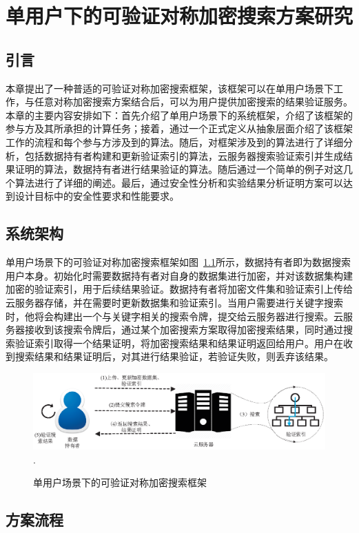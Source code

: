 \chapter{单用户下的可验证对称加密搜索方案研究}
\label{cha:single-user}
\section{引言}
本章提出了一种普适的可验证对称加密搜索框架\single，该框架可以在单用户场景下工作，与任意对称加密搜索方案结合后，可以为用户提供加密搜索的结果验证服务。本章的主要内容安排如下：首先介绍了单用户场景下的系统框架，介绍了该框架的参与方及其所承担的计算任务；接着，通过一个正式定义从抽象层面介绍了该框架工作的流程和每个参与方涉及到的算法。随后，对\single 框架涉及到的算法进行了详细分析，包括数据持有者构建和更新验证索引的算法，云服务器搜索验证索引并生成结果证明的算法，数据持有者进行结果验证的算法。随后通过一个简单的例子对这几个算法进行了详细的阐述。最后，通过安全性分析和实验结果分析证明\single 方案可以达到设计目标中的安全性要求和性能要求。

\section{系统架构}
单用户场景下的可验证对称加密搜索框架如图~\ref{fig:GS-VSSE}所示，数据持有者即为数据搜索用户本身。初始化时需要数据持有者对自身的数据集进行加密，并对该数据集构建加密的验证索引，用于后续结果验证。数据持有者将加密文件集和验证索引上传给云服务器存储，并在需要时更新数据集和验证索引。当用户需要进行关键字搜索时，他将会构建出一个与关键字相关的搜索令牌，提交给云服务器进行搜索。云服务器接收到该搜索令牌后，通过某个加密搜索方案取得加密搜索结果，同时通过搜索验证索引取得一个结果证明，将加密搜索结果和结果证明返回给用户。用户在收到搜索结果和结果证明后，对其进行结果验证，若验证失败，则丢弃该结果。
\begin{figure}[t]
\centering
\includegraphics[width=6 in]{fig/GS-VSSE}
\DeclareGraphicsExtensions.
\caption{单用户场景下的可验证对称加密搜索框架\single}
\label{fig:GS-VSSE}
\end{figure}

\section{方案流程}

